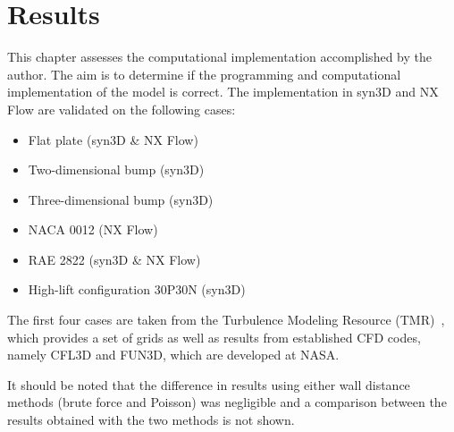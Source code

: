 \chapter{Results}
\label{chap:results}
This chapter assesses the computational implementation accomplished by the author. The aim is to determine if the programming and computational implementation of the model is correct. The implementation in syn3D and NX Flow are validated on the following cases:
\begin{itemize}
    \item Flat plate (syn3D \& NX Flow)
    \item Two-dimensional bump (syn3D)
    \item Three-dimensional bump (syn3D)
    \item NACA 0012 (NX Flow)
    \item RAE 2822 (syn3D \& NX Flow)
    \item High-lift configuration 30P30N (syn3D)
\end{itemize}
The first four cases are taken from the Turbulence Modeling Resource (TMR)~\cite{tmr}, which provides a set of grids as well as results from established CFD codes, namely CFL3D and FUN3D, which are developed at NASA. 

It should be noted that the difference in results using either wall distance methods (brute force and Poisson) was negligible and a comparison between the results obtained with the two methods is not shown.







%
%